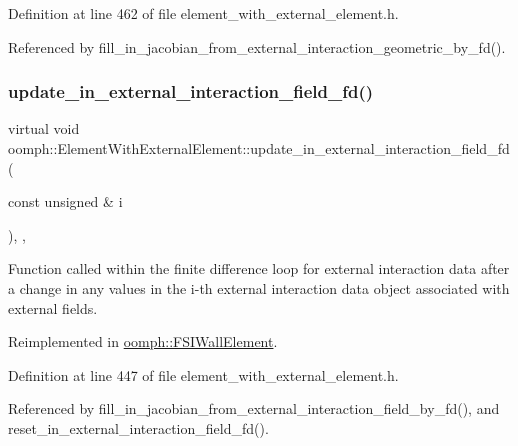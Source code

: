 Definition at line 462 of file element\+\_\+with\+\_\+external\+\_\+element.\+h.



Referenced by fill\+\_\+in\+\_\+jacobian\+\_\+from\+\_\+external\+\_\+interaction\+\_\+geometric\+\_\+by\+\_\+fd().

\mbox{\label{classoomph_1_1ElementWithExternalElement_ae8dac1e4db8e6833fda1150583ce5a21}} 
\subsubsection{\texorpdfstring{update\+\_\+in\+\_\+external\+\_\+interaction\+\_\+field\+\_\+fd()}{update\_in\_external\_interaction\_field\_fd()}}
{\footnotesize\ttfamily virtual void oomph\+::\+Element\+With\+External\+Element\+::update\+\_\+in\+\_\+external\+\_\+interaction\+\_\+field\+\_\+fd (\begin{DoxyParamCaption}\item[{const unsigned \&}]{i }\end{DoxyParamCaption})\hspace{0.3cm}{\ttfamily [inline]}, {\ttfamily [protected]}, {\ttfamily [virtual]}}



Function called within the finite difference loop for external interaction data after a change in any values in the i-\/th external interaction data object associated with external fields. 



Reimplemented in \hyperlink{classoomph_1_1FSIWallElement_ab427113ed6de36a5e8458e67eac7b6b4}{oomph\+::\+F\+S\+I\+Wall\+Element}.



Definition at line 447 of file element\+\_\+with\+\_\+external\+\_\+element.\+h.



Referenced by fill\+\_\+in\+\_\+jacobian\+\_\+from\+\_\+external\+\_\+interaction\+\_\+field\+\_\+by\+\_\+fd(), and reset\+\_\+in\+\_\+external\+\_\+interaction\+\_\+field\+\_\+fd().

